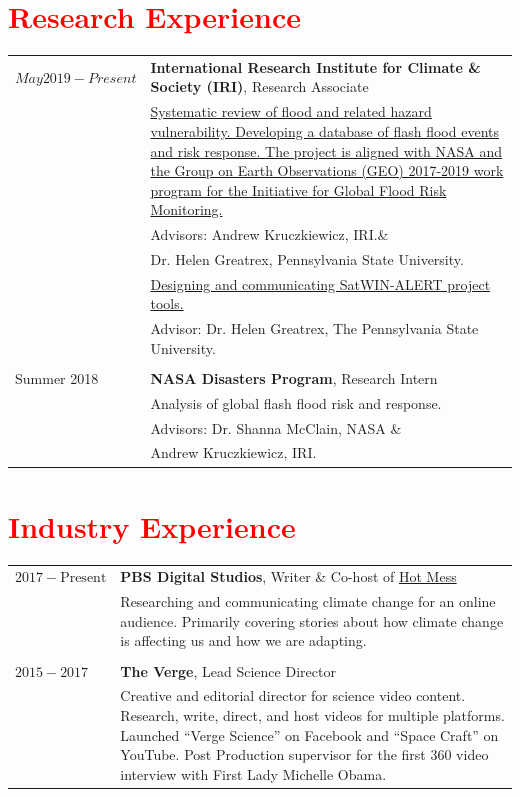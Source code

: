 \documentclass[margin, line]{res}
\begin{document}
\begin{resume}
\section{\sc \textcolor{Red}{\large{Research Experience}}}
\vspace*{0.05in}
\begin{tabular}{@{}p{1 in}p{4in}}
$May 2019 - Present$ & \textbf{International Research Institute for Climate \& Society (IRI)},  Research Associate \\
& \href{GEO}{Systematic review of flood and related hazard vulnerability.  Developing a database of flash flood events and risk response. The project is aligned with NASA and the Group on Earth Observations (GEO) 2017-2019 work program for the Initiative for Global Flood Risk Monitoring.} \\
& \hspace{0.2in} Advisors: Andrew Kruczkiewicz, IRI.\& \\
& \hspace{.82in} Dr. Helen Greatrex, Pennsylvania State University. \\
& \href{SatWIN}{Designing and communicating SatWIN-ALERT project tools.} \\
& \hspace{0.2in} Advisor: Dr. Helen Greatrex, The Pennsylvania State University. \ 
\\ \\
Summer 2018 & \textbf{NASA Disasters Program}, Research Intern  \\
& Analysis of global flash flood risk and response.  \\
& \hspace{0.2in} Advisors:  Dr. Shanna McClain, NASA \& \\
& \hspace{.82in} Andrew Kruczkiewicz, IRI. \\

\end{tabular}

\section{\sc \textcolor{Red}{\large{Industry Experience}}}
\vspace*{0.05in}
\begin{tabular}{@{}p{1 in}p{4in}}
$2017 - \text{Present}$  & \textbf{PBS Digital Studios}, Writer \& Co-host of \href{HM}{Hot Mess}\\
& Researching and communicating climate change for an online audience. Primarily covering stories about how climate change is affecting us and how we are adapting.\\
\\
$2015 - 2017$ & \textbf{The Verge}, Lead Science Director  \\
& Creative and editorial director for science video content. Research, write, direct, and host videos for multiple platforms. Launched “Verge Science” on Facebook and “Space Craft” on YouTube.  Post Production supervisor for the first 360 video interview with First Lady Michelle Obama. \\


\end{tabular}
\end{resume}
\end{document}
